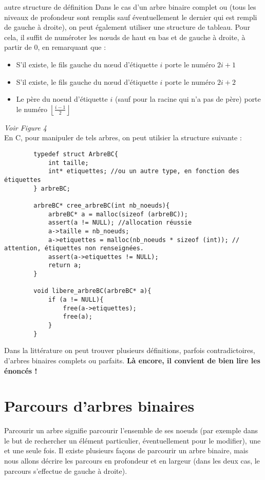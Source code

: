 \begin{exemple}{7.13}{autre structure de définition}
    Dans le cas d'un arbre binaire complet ou  (tous les niveaux de profondeur sont remplis sauf éventuellement le dernier qui est rempli de gauche à droite), on peut également utiliser une structure de tableau. Pour cela, il suffit de numéroter les nœuds de haut en bas et de gauche à droite, à partir de 0, en remarquant que : \begin{itemize}
        \item S'il existe, le fils gauche du nœud d'étiquette $i$ porte le numéro $2i + 1$
        \item S'il existe, le fils gauche du nœud d'étiquette $i$ porte le numéro $2i + 2$
        \item Le père du noeud d'étiquette $i$ (sauf pour la racine qui n'a pas de père) porte le numéro $\left\lfloor \frac{i-1}{2}\right\rfloor $
    \end{itemize}
    \textit{Voir Figure 4} \\ En C, pour manipuler de tels arbres, on peut utilsier la structure suivante :
    \begin{verbatim}
        typedef struct ArbreBC{
            int taille;
            int* etiquettes; //ou un autre type, en fonction des étiquettes
        } arbreBC;

        arbreBC* cree_arbreBC(int nb_noeuds){
            arbreBC* a = malloc(sizeof (arbreBC));
            assert(a != NULL); //allocation réussie
            a->taille = nb_noeuds;
            a->etiquettes = malloc(nb_noeuds * sizeof (int)); // attention, étiquettes non renseignées.
            assert(a->etiquettes != NULL);
            return a;
        }

        void libere_arbreBC(arbreBC* a){
            if (a != NULL){
                free(a->etiquettes);
                free(a);
            }
        }
    \end{verbatim}
\end{exemple}

 \begin{remarque}{7.14}{}
    Dans la littérature on peut trouver plusieurs définitions, parfois contradictoires, d'arbres binaires complets ou parfaits. \textbf{Là encore, il convient de bien lire les énoncés !}
 \end{remarque}

 \section{Parcours d'arbres binaires}
 Parcourir un arbre signifie parcourir l'ensemble de ses noeuds (par exemple dans le but de rechercher un élément particulier, éventuellement pour le modifier), une et une seule fois. Il existe plusieurs façons de parcourir un arbre binaire, mais nous allons décrire les parcours en profondeur et en largeur (dans les deux cas, le parcours s'effectue de gauche à droite).

